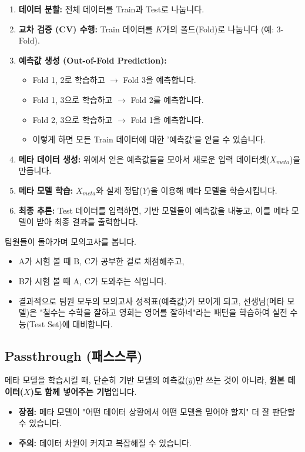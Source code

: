 \documentclass[11pt,a4paper]{book}
\theoremstyle{definition}
\begin{document}
\begin{enumerate}
    \item \textbf{데이터 분할:} 전체 데이터를 Train과 Test로 나눕니다.
    \item \textbf{교차 검증 (CV) 수행:} Train 데이터를 $K$개의 폴드(Fold)로 나눕니다 (예: 3-Fold).
    \item \textbf{예측값 생성 (Out-of-Fold Prediction):}
    \begin{itemize}
        \item Fold 1, 2로 학습하고 $\rightarrow$ Fold 3을 예측합니다.
        \item Fold 1, 3으로 학습하고 $\rightarrow$ Fold 2를 예측합니다.
        \item Fold 2, 3으로 학습하고 $\rightarrow$ Fold 1을 예측합니다.
        \item 이렇게 하면 모든 Train 데이터에 대한 '예측값'을 얻을 수 있습니다.
    \end{itemize}
    \item \textbf{메타 데이터 생성:} 위에서 얻은 예측값들을 모아서 새로운 입력 데이터셋($X_{meta}$)을 만듭니다.
    \item \textbf{메타 모델 학습:} $X_{meta}$와 실제 정답($Y$)을 이용해 메타 모델을 학습시킵니다.
    \item \textbf{최종 추론:} Test 데이터를 입력하면, 기반 모델들이 예측값을 내놓고, 이를 메타 모델이 받아 최종 결과를 출력합니다.
\end{enumerate}

\begin{analogybox}[title={Stacking 과정 비유}]
팀원들이 돌아가며 모의고사를 봅니다.
\begin{itemize}
    \item A가 시험 볼 때 B, C가 공부한 걸로 채점해주고,
    \item B가 시험 볼 때 A, C가 도와주는 식입니다.
    \item 결과적으로 팀원 모두의 모의고사 성적표(예측값)가 모이게 되고, 선생님(메타 모델)은 "철수는 수학을 잘하고 영희는 영어를 잘하네"라는 패턴을 학습하여 실전 수능(Test Set)에 대비합니다.
\end{itemize}
\end{analogybox}

\subsection{Passthrough (패스스루)}
메타 모델을 학습시킬 때, 단순히 기반 모델의 예측값($\hat{y}$)만 쓰는 것이 아니라, \textbf{원본 데이터($X$)도 함께 넣어주는 기법}입니다.
\begin{itemize}
    \item \textbf{장점:} 메타 모델이 "어떤 데이터 상황에서 어떤 모델을 믿어야 할지" 더 잘 판단할 수 있습니다.
    \item \textbf{주의:} 데이터 차원이 커지고 복잡해질 수 있습니다.
\end{itemize}
\end{document}
